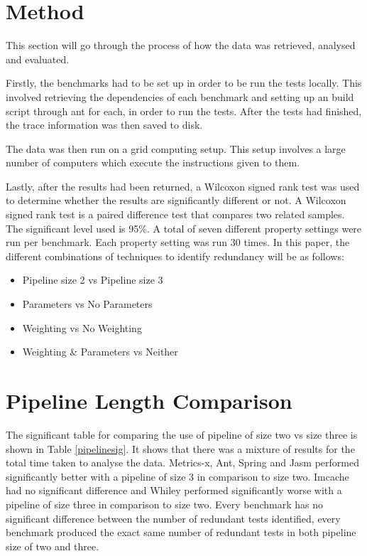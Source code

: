\section{Method}

This section will go through the process of how the data was retrieved, analysed and evaluated.

Firstly, the benchmarks had to be set up in order to be run the tests locally. This involved retrieving the dependencies of each benchmark and setting up an build script through ant for each, in order to run the tests. After the tests had finished, the trace information was then saved to disk.

The data was then run on a grid computing setup. This setup involves a large number of computers which execute the instructions given to them.

Lastly, after the results had been returned, a Wilcoxon signed rank test was used to determine whether the results are significantly different or not. A Wilcoxon signed rank test is a paired difference test that compares two related samples. The significant level used is 95\%. A total of seven different property settings were run per benchmark.  Each property setting was run 30 times. In this paper, the different combinations of techniques to identify redundancy will be as follows: 

\begin{itemize}
\item Pipeline size 2 vs Pipeline size 3
\item Parameters vs No Parameters
\item Weighting vs No Weighting
\item Weighting \& Parameters vs Neither
\end{itemize}

\section{Pipeline Length Comparison}
The significant table for comparing the use of pipeline of size two vs size three is shown in Table \ref{pipelinesig}. It shows that there was a mixture of results for the total time taken to analyse the data. Metrics-x, Ant, Spring and Jasm performed significantly better with a pipeline of size 3 in comparison to size two. Imcache had no significant difference and Whiley performed significantly worse with a pipeline of size three in comparison to size two. Every benchmark has no significant difference between the number of redundant tests identified, every benchmark produced the exact same number of redundant tests in both pipeline size of two and three.


